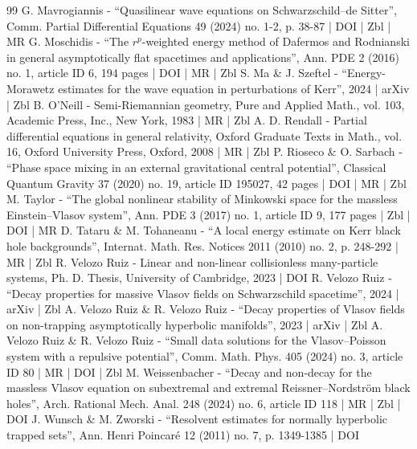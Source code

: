 \documentclass[10pt]{amsart}
\theoremstyle{plain}
\theoremstyle{definition}
\begin{document}
\begin{thebibliography}{99}
G. Mavrogiannis - “Quasilinear wave equations on Schwarzschild–de Sitter”, Comm. Partial Differential Equations 49 (2024) no. 1-2, p. 38-87 | DOI | Zbl | MR
G. Moschidis - “The $r^p$-weighted energy method of Dafermos and Rodnianski in general asymptotically flat spacetimes and applications”, Ann. PDE 2 (2016) no. 1, article ID 6, 194 pages | DOI | MR | Zbl
S. Ma \& J. Szeftel - “Energy-Morawetz estimates for the wave equation in perturbations of Kerr”, 2024 | arXiv | Zbl
B. O’Neill - Semi-Riemannian geometry, Pure and Applied Math., vol. 103, Academic Press, Inc., New York, 1983 | MR | Zbl
A. D. Rendall - Partial differential equations in general relativity, Oxford Graduate Texts in Math., vol. 16, Oxford University Press, Oxford, 2008 | MR | Zbl
P. Rioseco \& O. Sarbach - “Phase space mixing in an external gravitational central potential”, Classical Quantum Gravity 37 (2020) no. 19, article ID 195027, 42 pages | DOI | MR | Zbl
M. Taylor - “The global nonlinear stability of Minkowski space for the massless Einstein–Vlasov system”, Ann. PDE 3 (2017) no. 1, article ID 9, 177 pages | Zbl | DOI | MR
D. Tataru \& M. Tohaneanu - “A local energy estimate on Kerr black hole backgrounds”, Internat. Math. Res. Notices 2011 (2010) no. 2, p. 248-292 | MR | Zbl
R. Velozo Ruiz - Linear and non-linear collisionless many-particle systems, Ph. D. Thesis, University of Cambridge, 2023 | DOI
R. Velozo Ruiz - “Decay properties for massive Vlasov fields on Schwarzschild spacetime”, 2024 | arXiv | Zbl
A. Velozo Ruiz \& R. Velozo Ruiz - “Decay properties of Vlasov fields on non-trapping asymptotically hyperbolic manifolds”, 2023 | arXiv | Zbl
A. Velozo Ruiz \& R. Velozo Ruiz - “Small data solutions for the Vlasov–Poisson system with a repulsive potential”, Comm. Math. Phys. 405 (2024) no. 3, article ID 80 | MR | DOI | Zbl
M. Weissenbacher - “Decay and non-decay for the massless Vlasov equation on subextremal and extremal Reissner–Nordström black holes”, Arch. Rational Mech. Anal. 248 (2024) no. 6, article ID 118 | MR | Zbl | DOI
J. Wunsch \& M. Zworski - “Resolvent estimates for normally hyperbolic trapped sets”, Ann. Henri Poincaré 12 (2011) no. 7, p. 1349-1385 | DOI
\end{thebibliography}
\end{document}
